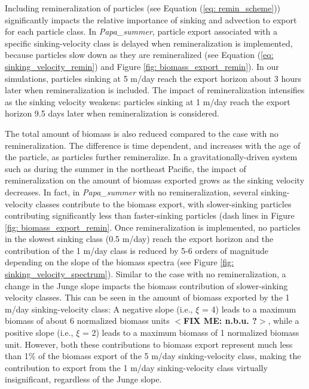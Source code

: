 \documentclass[draft,linenumbers]{agujournal2018}
\newcommand{\fixme}[1]{\color{red}$<$\textbf{FIX ME: #1}$>$\color{black}}
\begin{document}
 Including remineralization of particles (see Equation (\ref{eq: remin_scheme})) significantly impacts the relative importance of sinking and advection to export for each particle class. In \textit{Papa\_summer}, particle export associated with a specific sinking-velocity class is delayed when remineralization is implemented, because particles slow down as they are remineralized (see Equation (\ref{eq: sinking_velocity_remin}) and Figure \ref{fig: biomass_export_remin}). In our simulations, particles sinking at 5 m/day reach the export horizon about 3 hours later when remineralization is included. The impact of remineralization intensifies as the sinking velocity weakens: particles sinking at 1 m/day reach the export horizon 9.5 days later when remineralization is considered.
 
 The total amount of biomass is also reduced compared to the case with no remineralization. The difference is time dependent, and increases with the age of the particle, as particles further remineralize. In a gravitationally-driven system such as during the summer in the northeast Pacific, the impact of remineralization on the amount of biomass exported grows as the sinking velocity decreases. In fact, in \textit{Papa\_summer} with no remineralization, several sinking-velocity classes contribute to the biomass export, with slower-sinking particles contributing significantly less than faster-sinking particles (dash lines in Figure \ref{fig: biomass_export_remin}. Once remineralization is implemented, no particles in the slowest sinking class (0.5 m/day) reach the export horizon and the contribution of the 1 m/day class is reduced by 5-6 orders of magnitude depending on the slope of the biomass spectra (see Figure \ref{fig: sinking_velocity_spectrum}). Similar to the case with no remineralization, a change in the Junge slope impacts the biomass contribution of slower-sinking velocity classes. This can be seen in the amount of biomass exported by the 1 m/day sinking-velocity class: A negative slope (i.e., $\xi$ = 4) leads to a maximum biomass of about 6 normalized biomass units \fixme{n.b.u. ?}, while a positive slope (i.e., $\xi$ = 2) leads to a maximum biomass of 1 normalized biomass unit. However, both these contributions to biomass export represent much less than 1\% of the biomass export of the 5 m/day sinking-velocity class, making the contribution to export from the 1 m/day sinking-velocity class virtually insignificant, regardless of the Junge slope.
 
\end{document}
